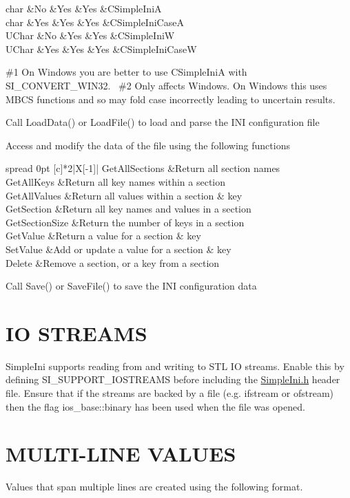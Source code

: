\begin{DoxyEnumerate}
\begin{longtabu}
char &No &Yes &Yes &C\+Simple\+IniA \\
char &Yes &Yes &Yes &C\+Simple\+Ini\+CaseA \\
U\+Char &No &Yes &Yes &C\+Simple\+IniW \\
U\+Char &Yes &Yes &Yes &C\+Simple\+Ini\+CaseW \\
\end{longtabu}
\#1 On Windows you are better to use C\+Simple\+IniA with S\+I\+\_\+\+C\+O\+N\+V\+E\+R\+T\+\_\+\+W\+I\+N32.~\newline
 \#2 Only affects Windows. On Windows this uses M\+B\+CS functions and so may fold case incorrectly leading to uncertain results.
\item Call Load\+Data() or Load\+File() to load and parse the I\+NI configuration file
\item Access and modify the data of the file using the following functions \tabulinesep=1mm
\begin{longtabu} spread 0pt [c]{*{2}{|X[-1]}|}
\hline
Get\+All\+Sections &Return all section names \\
Get\+All\+Keys &Return all key names within a section \\
Get\+All\+Values &Return all values within a section \& key \\
Get\+Section &Return all key names and values in a section \\
Get\+Section\+Size &Return the number of keys in a section \\
Get\+Value &Return a value for a section \& key \\
Set\+Value &Add or update a value for a section \& key \\
Delete &Remove a section, or a key from a section \\
\end{longtabu}

\item Call Save() or Save\+File() to save the I\+NI configuration data
\end{DoxyEnumerate}\hypertarget{index_iostreams}{}\section{I\+O S\+T\+R\+E\+A\+MS}\label{index_iostreams}
Simple\+Ini supports reading from and writing to S\+TL IO streams. Enable this by defining S\+I\+\_\+\+S\+U\+P\+P\+O\+R\+T\+\_\+\+I\+O\+S\+T\+R\+E\+A\+MS before including the \hyperlink{a00473_source}{Simple\+Ini.\+h} header file. Ensure that if the streams are backed by a file (e.\+g. ifstream or ofstream) then the flag ios\+\_\+base\+::binary has been used when the file was opened.\hypertarget{index_multiline}{}\section{M\+U\+L\+T\+I-\/\+L\+I\+N\+E V\+A\+L\+U\+ES}\label{index_multiline}
Values that span multiple lines are created using the following format.


